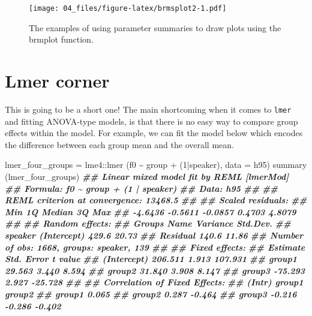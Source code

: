 \documentclass[
]{book}
\newenvironment{Shaded}{\begin{snugshade}}{\end{snugshade}}
\newcommand{\AttributeTok}[1]{\textcolor[rgb]{0.77,0.63,0.00}{#1}}
\newcommand{\DecValTok}[1]{\textcolor[rgb]{0.00,0.00,0.81}{#1}}
\newcommand{\DocumentationTok}[1]{\textcolor[rgb]{0.56,0.35,0.01}{\textbf{\textit{#1}}}}
\newcommand{\FunctionTok}[1]{\textcolor[rgb]{0.00,0.00,0.00}{#1}}
\newcommand{\NormalTok}[1]{#1}
\newcommand{\OtherTok}[1]{\textcolor[rgb]{0.56,0.35,0.01}{#1}}
\newcommand{\SpecialCharTok}[1]{\textcolor[rgb]{0.00,0.00,0.00}{#1}}
\begin{document}
\begin{figure}
\centering
\texttt{[image: 04\_files/figure-latex/brmsplot2-1.pdf]}
\caption{\label{fig:brmsplot2}The examples of using parameter summaries to draw plots using the brmplot function.}
\end{figure}

\hypertarget{lmer-corner-1}{%
\section{Lmer corner}\label{lmer-corner-1}}

This is going to be a short one! The main shortcoming when it comes to \texttt{lmer} and fitting ANOVA-type models, is that there is no easy way to compare group effects within the model. For example, we can fit the model below which encodes the difference between each group mean and the overall mean.

\begin{Shaded}
\begin{Highlighting}[]
\NormalTok{lmer\_four\_groups }\OtherTok{=}\NormalTok{ lme4}\SpecialCharTok{::}\FunctionTok{lmer}\NormalTok{ (f0 }\SpecialCharTok{\textasciitilde{}}\NormalTok{ group }\SpecialCharTok{+}\NormalTok{ (}\DecValTok{1}\SpecialCharTok{|}\NormalTok{speaker), }\AttributeTok{data =}\NormalTok{ h95)}
\FunctionTok{summary}\NormalTok{ (lmer\_four\_groups)}
\DocumentationTok{\#\# Linear mixed model fit by REML [\textquotesingle{}lmerMod\textquotesingle{}]}
\DocumentationTok{\#\# Formula: f0 \textasciitilde{} group + (1 | speaker)}
\DocumentationTok{\#\#    Data: h95}
\DocumentationTok{\#\# }
\DocumentationTok{\#\# REML criterion at convergence: 13468.5}
\DocumentationTok{\#\# }
\DocumentationTok{\#\# Scaled residuals: }
\DocumentationTok{\#\#     Min      1Q  Median      3Q     Max }
\DocumentationTok{\#\# {-}4.6436 {-}0.5611 {-}0.0857  0.4703  4.8079 }
\DocumentationTok{\#\# }
\DocumentationTok{\#\# Random effects:}
\DocumentationTok{\#\#  Groups   Name        Variance Std.Dev.}
\DocumentationTok{\#\#  speaker  (Intercept) 429.6    20.73   }
\DocumentationTok{\#\#  Residual             140.6    11.86   }
\DocumentationTok{\#\# Number of obs: 1668, groups:  speaker, 139}
\DocumentationTok{\#\# }
\DocumentationTok{\#\# Fixed effects:}
\DocumentationTok{\#\#             Estimate Std. Error t value}
\DocumentationTok{\#\# (Intercept)  206.511      1.913 107.931}
\DocumentationTok{\#\# group1        29.563      3.440   8.594}
\DocumentationTok{\#\# group2        31.840      3.908   8.147}
\DocumentationTok{\#\# group3       {-}75.293      2.927 {-}25.728}
\DocumentationTok{\#\# }
\DocumentationTok{\#\# Correlation of Fixed Effects:}
\DocumentationTok{\#\#        (Intr) group1 group2}
\DocumentationTok{\#\# group1  0.065              }
\DocumentationTok{\#\# group2  0.287 {-}0.464       }
\DocumentationTok{\#\# group3 {-}0.216 {-}0.286 {-}0.402}
\end{Highlighting}
\end{Shaded}
\end{document}
